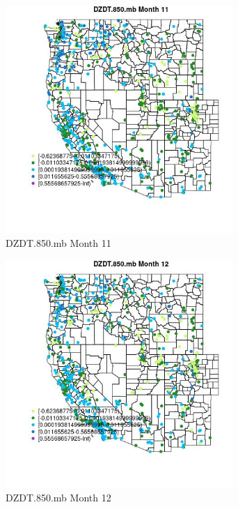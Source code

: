 \begin{figure} 
\centering  
\includegraphics[width=0.77\textwidth]{Code_Outputs/Report_ML_input_PM25_Step4_part_e_de_duplicated_aves_compiled_2019-05-21wNAs_MapObsMo11DZDT850mb.jpg} 
\caption{\label{fig:Report_ML_input_PM25_Step4_part_e_de_duplicated_aves_compiled_2019-05-21wNAsMapObsMo11DZDT850mb}DZDT.850.mb Month 11} 
\end{figure} 
 

\begin{figure} 
\centering  
\includegraphics[width=0.77\textwidth]{Code_Outputs/Report_ML_input_PM25_Step4_part_e_de_duplicated_aves_compiled_2019-05-21wNAs_MapObsMo12DZDT850mb.jpg} 
\caption{\label{fig:Report_ML_input_PM25_Step4_part_e_de_duplicated_aves_compiled_2019-05-21wNAsMapObsMo12DZDT850mb}DZDT.850.mb Month 12} 
\end{figure} 
 

